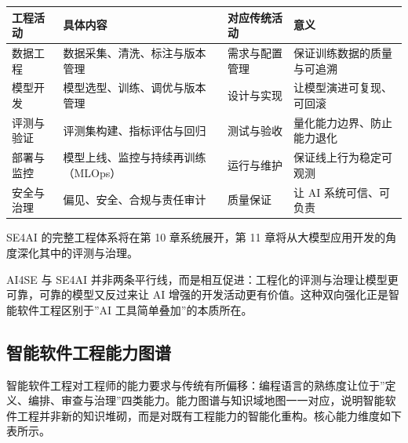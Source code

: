 \documentclass[
]{ctexbook}
\newcounter{none}
\begin{document}
{\def\LTcaptype{none} %
\begin{longtable}[]{@{}
  >{\raggedright\arraybackslash}p{}
  >{\raggedright\arraybackslash}p{}
  >{\raggedright\arraybackslash}p{}
  >{\raggedright\arraybackslash}p{}@{}}
\toprule\noalign{}
\begin{minipage}[b]{\linewidth}\raggedright
工程活动
\end{minipage} & \begin{minipage}[b]{\linewidth}\raggedright
具体内容
\end{minipage} & \begin{minipage}[b]{\linewidth}\raggedright
对应传统活动
\end{minipage} & \begin{minipage}[b]{\linewidth}\raggedright
意义
\end{minipage} \\
\midrule\noalign{}
\endhead
\bottomrule\noalign{}
\endlastfoot
数据工程 & 数据采集、清洗、标注与版本管理 & 需求与配置管理 &
保证训练数据的质量与可追溯 \\
模型开发 & 模型选型、训练、调优与版本管理 & 设计与实现 &
让模型演进可复现、可回滚 \\
评测与验证 & 评测集构建、指标评估与回归 & 测试与验收 &
量化能力边界、防止能力退化 \\
部署与监控 & 模型上线、监控与持续再训练（MLOps） & 运行与维护 &
保证线上行为稳定可观测 \\
安全与治理 & 偏见、安全、合规与责任审计 & 质量保证 & 让 AI
系统可信、可负责 \\
\end{longtable}
}

SE4AI 的完整工程体系将在第 10 章系统展开，第 11
章将从大模型应用开发的角度深化其中的评测与治理。

AI4SE 与 SE4AI
并非两条平行线，而是相互促进：工程化的评测与治理让模型更可靠，可靠的模型又反过来让
AI 增强的开发活动更有价值。这种双向强化正是智能软件工程区别于''AI
工具简单叠加''的本质所在。

\subsection{智能软件工程能力图谱}\label{ux667aux80fdux8f6fux4ef6ux5de5ux7a0bux80fdux529bux56feux8c31}

智能软件工程对工程师的能力要求与传统有所偏移：编程语言的熟练度让位于''定义、编排、审查与治理''四类能力。能力图谱与知识域地图一一对应，说明智能软件工程并非新的知识堆砌，而是对既有工程能力的智能化重构。核心能力维度如下表所示。
\end{document}
